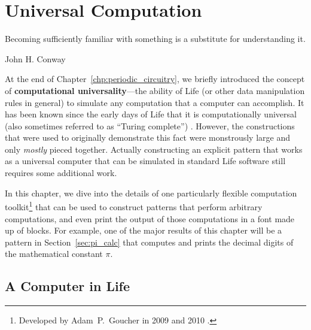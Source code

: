 

\renewcommand{\chapterfolder}{universal_computation/}
\chapter{Universal Computation}\label{chp:universal_computation}


\vspace*{-0.4in}
\epigraph{Becoming sufficiently familiar with something is a substitute for understanding it.}{John H. Conway}
\vspace*{0.4in}


\noindent At the end of Chapter~\ref{chp:periodic_circuitry}, we briefly introduced the concept of \textbf{computational universality}---the ability of Life (or other data manipulation rules in general) to simulate any computation that a computer can accomplish. It has been known since the early days of Life that it is computationally universal (also sometimes referred to as ``Turing complete'') \cite{Wain74,BCG82}.  However, the constructions that were used to originally demonstrate this fact were monstrously large and only \emph{mostly} pieced together. Actually constructing an explicit pattern that works as a universal computer that can be simulated in standard Life software still requires some additional work.

In this chapter, we dive into the details of one particularly flexible computation toolkit\footnote{Developed by Adam~P.~Goucher in 2009 and 2010 \cite{Gou10}.} that can be used to construct patterns that perform arbitrary computations, and even print the output of those computations in a font made up of blocks. For example, one of the major results of this chapter will be a pattern in Section~\ref{sec:pi_calc} that computes and prints the decimal digits of the mathematical constant $\pi$.


\section{A Computer in Life}\label{sec:computer_in_life}

